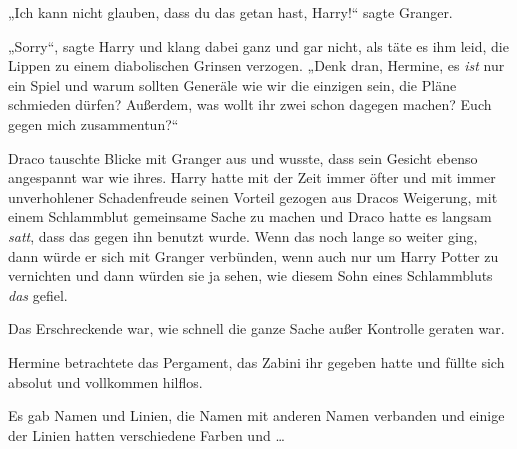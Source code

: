 „Ich kann nicht glauben, dass du das getan hast, Harry!“ sagte Granger.

„Sorry“, sagte Harry und klang dabei ganz und gar nicht, als täte es ihm leid, die Lippen zu einem diabolischen Grinsen verzogen.
„Denk dran, Hermine, es \emph{ist} nur ein Spiel und warum sollten Generäle wie wir die einzigen sein, die Pläne schmieden dürfen? Außerdem, was wollt ihr zwei schon dagegen machen? Euch gegen mich zusammentun?“

Draco tauschte Blicke mit Granger aus und wusste, dass sein Gesicht ebenso angespannt war wie ihres. Harry hatte mit der Zeit immer öfter und mit immer unverhohlener Schadenfreude seinen Vorteil gezogen aus Dracos Weigerung, mit einem Schlammblut gemeinsame Sache zu machen und Draco hatte es langsam \emph{satt}, dass das gegen ihn benutzt wurde. Wenn das noch lange so weiter ging, dann würde er sich mit Granger verbünden, wenn auch nur um Harry Potter zu vernichten und dann würden sie ja sehen, wie diesem Sohn eines Schlammbluts \emph{das} gefiel.

\later

Das Erschreckende war, wie schnell die ganze Sache außer Kontrolle geraten war.

Hermine betrachtete das Pergament, das Zabini ihr gegeben hatte und füllte sich absolut und vollkommen hilflos.

Es gab Namen und Linien, die Namen mit anderen Namen verbanden und einige der Linien hatten verschiedene Farben und …

